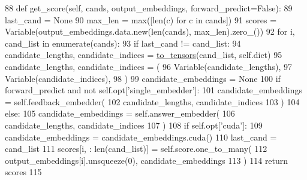 \begin{DoxyCode}
88     \textcolor{keyword}{def }get\_score(self, cands, output\_embeddings, forward\_predict=False):
89         last\_cand = \textcolor{keywordtype}{None}
90         max\_len = max([len(c) \textcolor{keywordflow}{for} c \textcolor{keywordflow}{in} cands])
91         scores = Variable(output\_embeddings.data.new(len(cands), max\_len).zero\_())
92         \textcolor{keywordflow}{for} i, cand\_list \textcolor{keywordflow}{in} enumerate(cands):
93             \textcolor{keywordflow}{if} last\_cand != cand\_list:
94                 candidate\_lengths, candidate\_indices = \hyperlink{namespaceprojects_1_1memnn__feedback_1_1agent_1_1modules_aa0f3493dccc8a3c07b66c48378f14003}{to\_tensors}(cand\_list, self.dict)
95                 candidate\_lengths, candidate\_indices = (
96                     Variable(candidate\_lengths),
97                     Variable(candidate\_indices),
98                 )
99                 candidate\_embeddings = \textcolor{keywordtype}{None}
100                 \textcolor{keywordflow}{if} forward\_predict \textcolor{keywordflow}{and} \textcolor{keywordflow}{not} self.opt[\textcolor{stringliteral}{'single\_embedder'}]:
101                     candidate\_embeddings = self.feedback\_embedder(
102                         candidate\_lengths, candidate\_indices
103                     )
104                 \textcolor{keywordflow}{else}:
105                     candidate\_embeddings = self.answer\_embedder(
106                         candidate\_lengths, candidate\_indices
107                     )
108                 \textcolor{keywordflow}{if} self.opt[\textcolor{stringliteral}{'cuda'}]:
109                     candidate\_embeddings = candidate\_embeddings.cuda()
110                 last\_cand = cand\_list
111             scores[i, : len(cand\_list)] = self.score.one\_to\_many(
112                 output\_embeddings[i].unsqueeze(0), candidate\_embeddings
113             )
114         \textcolor{keywordflow}{return} scores
115 
\end{DoxyCode}
\mbox{\label{classprojects_1_1memnn__feedback_1_1agent_1_1modules_1_1MemNN_a74960a2ae628065a6c18e1125b8fd9fc}} 
